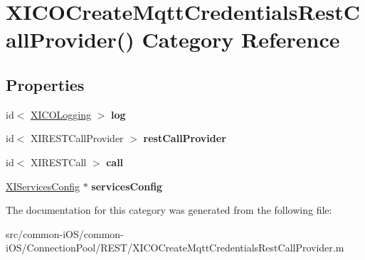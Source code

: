 \hypertarget{category_x_i_c_o_create_mqtt_credentials_rest_call_provider_07_08}{}\section{X\+I\+C\+O\+Create\+Mqtt\+Credentials\+Rest\+Call\+Provider() Category Reference}
\label{category_x_i_c_o_create_mqtt_credentials_rest_call_provider_07_08}
\subsection*{Properties}
\begin{DoxyCompactItemize}
\item 
\hypertarget{category_x_i_c_o_create_mqtt_credentials_rest_call_provider_07_08_a9fe245e2c54fb6854a091beb3547eb71}{}\label{category_x_i_c_o_create_mqtt_credentials_rest_call_provider_07_08_a9fe245e2c54fb6854a091beb3547eb71} 
id$<$ \hyperlink{protocol_x_i_c_o_logging-p}{X\+I\+C\+O\+Logging} $>$ {\bfseries log}
\item 
\hypertarget{category_x_i_c_o_create_mqtt_credentials_rest_call_provider_07_08_a26d2d0caca21c9bf18b2805079b57b5f}{}\label{category_x_i_c_o_create_mqtt_credentials_rest_call_provider_07_08_a26d2d0caca21c9bf18b2805079b57b5f} 
id$<$ X\+I\+R\+E\+S\+T\+Call\+Provider $>$ {\bfseries rest\+Call\+Provider}
\item 
\hypertarget{category_x_i_c_o_create_mqtt_credentials_rest_call_provider_07_08_af4148ab27c290084771ae7eb1cbb6ef0}{}\label{category_x_i_c_o_create_mqtt_credentials_rest_call_provider_07_08_af4148ab27c290084771ae7eb1cbb6ef0} 
id$<$ X\+I\+R\+E\+S\+T\+Call $>$ {\bfseries call}
\item 
\hypertarget{category_x_i_c_o_create_mqtt_credentials_rest_call_provider_07_08_a21629d8168a58d510f66abedce4177b7}{}\label{category_x_i_c_o_create_mqtt_credentials_rest_call_provider_07_08_a21629d8168a58d510f66abedce4177b7} 
\hyperlink{interface_x_i_services_config}{X\+I\+Services\+Config} $\ast$ {\bfseries services\+Config}
\end{DoxyCompactItemize}


The documentation for this category was generated from the following file\+:\begin{DoxyCompactItemize}
\item 
src/common-\/i\+O\+S/common-\/i\+O\+S/\+Connection\+Pool/\+R\+E\+S\+T/X\+I\+C\+O\+Create\+Mqtt\+Credentials\+Rest\+Call\+Provider.\+m\end{DoxyCompactItemize}
